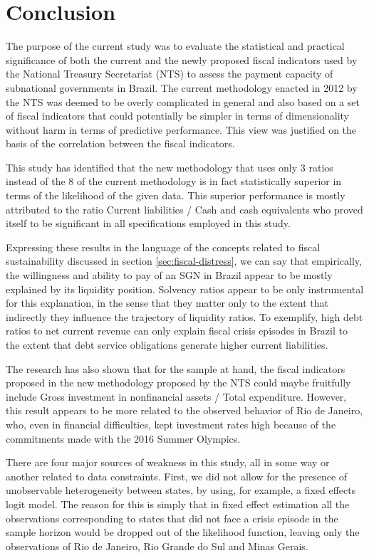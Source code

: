 \chapter{Conclusion}
\label{sec:conclusion}

The purpose of the current study was to evaluate the statistical and practical significance of both the current and the newly proposed fiscal indicators used by the National Treasury Secretariat (NTS) to assess the payment capacity of subnational governments in Brazil. The current methodology enacted in 2012 by the NTS was deemed to be overly complicated in general and also based on a set of fiscal indicators that could potentially be simpler in terms of dimensionality without harm in terms of predictive performance. This view was justified on the basis of the correlation between the fiscal indicators. %

This study has identified that the new methodology that uses only $3$ ratios instead of the $8$ of the current methodology is in fact statistically superior in terms of the likelihood of the given data. This superior performance is mostly attributed to the ratio Current liabilities / Cash and cash equivalents who proved itself to be significant in all specifications employed in this study. 

Expressing these results in the language of the concepts related to fiscal sustainability discussed in section \ref{sec:fiscal-distress}, we can say that empirically, the willingness and ability to pay of an SGN in Brazil appear to be mostly explained by its liquidity position. Solvency ratios appear to be only instrumental for this explanation, in the sense that they matter only to the extent that indirectly they influence the trajectory of liquidity ratios. To exemplify, high debt ratios to net current revenue can only explain fiscal crisis episodes in Brazil to the extent that debt service obligations generate higher current liabilities. 

The research has also shown that for the sample at hand, the fiscal indicators proposed in the new methodology proposed by the NTS could maybe fruitfully include Gross investment in nonfinancial assets / Total expenditure. However, this result appears to be more related to the observed behavior of Rio de Janeiro, who, even in financial difficulties, kept investment rates high because of the commitments made with the 2016 Summer Olympics.

There are four major sources of weakness in this study, all in some way or another related to data constraints. First, we did not allow for the presence of unobservable heterogeneity between states, by using, for example, a fixed effects logit model. The reason for this is simply that in fixed effect estimation all the observations corresponding to states that did not face a crisis episode in the sample horizon would be dropped out of the likelihood function, leaving only the observations of Rio de Janeiro, Rio Grande do Sul and Minas Gerais. 

